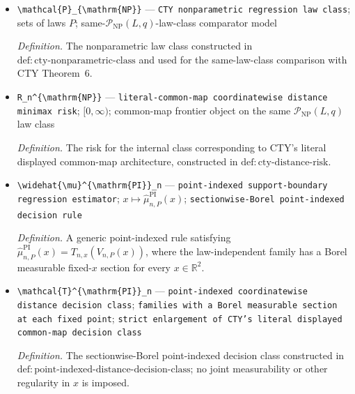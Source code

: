 \documentclass{article}
\begin{document}
\begin{itemize}
  \item \texttt{\textbackslash{}\allowbreak{}mathcal\{P\}\allowbreak{}\_\allowbreak{}\{\textbackslash{}\allowbreak{}mathrm\{NP\}\allowbreak{}\}\allowbreak{}} --- \texttt{CTY nonparametric regression law class}; sets of laws \(P\); same-\(\mathcal P_{\mathrm{NP}}(L,q)\)-law-class comparator model
  \par\smallskip\noindent\emph{Definition.} The nonparametric law class constructed in \(\mathrm{def:cty\text{-}nonparametric\text{-}class}\) and used for the same-law-class comparison with CTY Theorem~6.
  \item \texttt{R\_\allowbreak{}n\textasciicircum{}\{\textbackslash{}\allowbreak{}mathrm\{NP\}\allowbreak{}\}\allowbreak{}} --- \texttt{literal-\allowbreak{}common-\allowbreak{}map coordinatewise distance minimax risk}; \([0,\infty)\); common-map frontier object on the same \(\mathcal P_{\mathrm{NP}}(L,q)\) law class
  \par\smallskip\noindent\emph{Definition.} The risk for the internal class corresponding to CTY's literal displayed common-map architecture, constructed in \(\mathrm{def:cty\text{-}distance\text{-}risk}\).
  \item \texttt{\textbackslash{}\allowbreak{}widehat\{\textbackslash{}\allowbreak{}mu\}\allowbreak{}\textasciicircum{}\{\textbackslash{}\allowbreak{}mathrm\{PI\}\allowbreak{}\}\allowbreak{}\_\allowbreak{}n} --- \texttt{point-\allowbreak{}indexed support-\allowbreak{}boundary regression estimator}; \(x\mapsto\widehat\mu_{n,P}^{\mathrm{PI}}(x)\); \texttt{sectionwise-\allowbreak{}Borel point-\allowbreak{}indexed decision rule}
  \par\smallskip\noindent\emph{Definition.} A generic point-indexed rule satisfying \(\widehat\mu_{n,P}^{\mathrm{PI}}(x)=T_{n,x}(V_{n,P}(x))\), where the law-independent family has a Borel measurable fixed-\(x\) section for every \(x\in\mathbb R^2\).
  \item \texttt{\textbackslash{}\allowbreak{}mathcal\{T\}\allowbreak{}\textasciicircum{}\{\textbackslash{}\allowbreak{}mathrm\{PI\}\allowbreak{}\}\allowbreak{}\_\allowbreak{}n} --- \texttt{point-\allowbreak{}indexed coordinatewise distance decision class}; \texttt{families with a Borel measurable section at each fixed point}; \texttt{strict enlargement of CTY's literal displayed common-\allowbreak{}map decision class}
  \par\smallskip\noindent\emph{Definition.} The sectionwise-Borel point-indexed decision class constructed in \(\mathrm{def:point\text{-}indexed\text{-}distance\text{-}decision\text{-}class}\); no joint measurability or other regularity in \(x\) is imposed.

\end{itemize}
\end{document}
